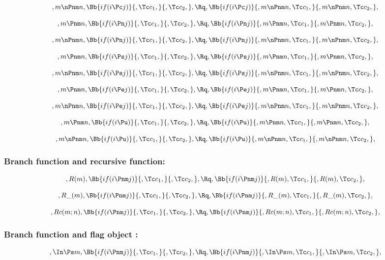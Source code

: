 \[,m \nPnm n, \Bb{if(i \Pc j)}{,\Tc c_1,}{,\Tc c_2,}, \Rq , \Bb{if(i \Pc j)}{,m \nPnm n,\Tc c_1,}{,m \nPnm n,\Tc c_2,},\]
\bigskip
\bigskip

\[,m \Pnm n, \Bb{if(i \Pn j)}{,\Tc c_1,}{,\Tc c_2,}, \Rq , \Bb{if(i \Pn j)}{,m \Pnm n,\Tc c_1,}{,m \Pnm n,\Tc c_2,},\]
\bigskip
\bigskip

\[,m \nPnm n, \Bb{if(i \Pn j)}{,\Tc c_1,}{,\Tc c_2,}, \Rq , \Bb{if(i \Pn j)}{,m \nPnm n,\Tc c_1,}{,m \nPnm n,\Tc c_2,},\]
\bigskip
\bigskip

\[,m \Pnm n, \Bb{if(i \Ps j)}{,\Tc c_1,}{,\Tc c_2,}, \Rq , \Bb{if(i \Ps j)}{,m \Pnm n,\Tc c_1,}{,m \Pnm n,\Tc c_2,},\]
\bigskip
\bigskip

\[,m \nPnm n, \Bb{if(i \Ps j)}{,\Tc c_1,}{,\Tc c_2,}, \Rq , \Bb{if(i \Ps j)}{,m \nPnm n,\Tc c_1,}{,m \nPnm n,\Tc c_2,},\]
\bigskip
\bigskip

\[,m \Pnm n, \Bb{if(i \Pe j)}{,\Tc c_1,}{,\Tc c_2,}, \Rq , \Bb{if(i \Pe j)}{,m \Pnm n,\Tc c_1,}{,m \Pnm n,\Tc c_2,},\]
\bigskip
\bigskip

\[,m \nPnm n, \Bb{if(i \Pe j)}{,\Tc c_1,}{,\Tc c_2,}, \Rq , \Bb{if(i \Pe j)}{,m \nPnm n,\Tc c_1,}{,m \nPnm n,\Tc c_2,},\]
\bigskip
\bigskip

\[,m \Pnm n, \Bb{if(i \Pu)}{,\Tc c_1,}{,\Tc c_2,}, \Rq , \Bb{if(i \Pu)}{,m \Pnm n,\Tc c_1,}{,m \Pnm n,\Tc c_2,},\]
\bigskip
\bigskip

\[,m \nPnm n, \Bb{if(i \Pu)}{,\Tc c_1,}{,\Tc c_2,}, \Rq , \Bb{if(i \Pu)}{,m \nPnm n,\Tc c_1,}{,m \nPnm n,\Tc c_2,},\]
\bigskip
\bigskip







\bigskip
\bigskip
\bigskip
\bigskip
\subsubsection{Branch function and recursive function:}
\[,R(m), \Bb{if(i \Pnm j)}{,\Tc c_1,}{,\Tc c_2,}, \Rq , \Bb{if(i \Pnm j)}{,R(m),\Tc c_1,}{,R(m),\Tc c_2,},\]
\bigskip
\bigskip

\[,R\_(m), \Bb{if(i \Pnm j)}{,\Tc c_1,}{,\Tc c_2,}, \Rq , \Bb{if(i \Pnm j)}{,R\_(m),\Tc c_1,}{,R\_(m),\Tc c_2,},\]
\bigskip
\bigskip

\[,Rc(m;n), \Bb{if(i \Pnm j)}{,\Tc c_1,}{,\Tc c_2,}, \Rq , \Bb{if(i \Pnm j)}{,Rc(m;n),\Tc c_1,}{,Rc(m;n),\Tc c_2,},\]
\bigskip
\bigskip




\bigskip
\bigskip
\bigskip
\bigskip
\subsubsection{Branch function and flag object :}
\[,\In \Ps m, \Bb{if(i \Pnm j)}{,\Tc c_1,}{,\Tc c_2,}, \Rq , \Bb{if(i \Pnm j)}{,\In \Ps m,\Tc c_1,}{,\In \Ps m,\Tc c_2,},\]
\bigskip
\bigskip

